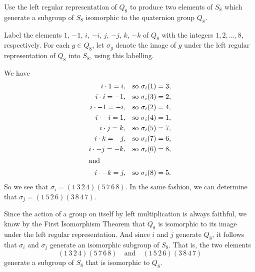  Use the left regular representation of $Q_8$ to produce two
elements of $S_8$ which generate a subgroup of $S_8$ isomorphic to the
quaternion group $Q_8$.
\begin{solution}
  Label the elements $1$, $-1$, $i$, $-i$, $j$, $-j$, $k$, $-k$ of
  $Q_8$ with the integers $1,2,\dots,8$, respectively. For each
  $g\in Q_8$, let $\sigma_g$ denote the image of $g$ under the left
  regular representation of $Q_8$ into $S_8$, using this labelling.

  We have
  \begin{align*}
    i\cdot1 = i, &\quad\text{so $\sigma_i(1) = 3$}, \\
    i\cdot i = -1, &\quad\text{so $\sigma_i(3) = 2$}, \\
    i\cdot-1 = -i, &\quad\text{so $\sigma_i(2) = 4$}, \\
    i\cdot-i = 1, &\quad\text{so $\sigma_i(4) = 1$}, \\
    i\cdot j = k, &\quad\text{so $\sigma_i(5) = 7$}, \\
    i\cdot k = -j, &\quad\text{so $\sigma_i(7) = 6$}, \\
    i\cdot-j = -k, &\quad\text{so $\sigma_i(6) = 8$}, \\
    \intertext{and}
    i\cdot-k = j, &\quad\text{so $\sigma_i(8) = 5$}.
  \end{align*}
  So we see that $\sigma_i = (1\,3\,2\,4)(5\,7\,6\,8)$. In the same
  fashion, we can determine that
  $\sigma_j = (1\,5\,2\,6)(3\,8\,4\,7)$.

  Since the action of a group on itself by left multiplication is
  always faithful, we know by the First Isomorphism Theorem that $Q_8$
  is isomorphic to its image under the left regular
  representation. And since $i$ and $j$ generate $Q_8$, it follows
  that $\sigma_i$ and $\sigma_j$ generate an isomorphic subgroup of
  $S_8$. That is, the two elements
  \begin{equation*}
    (1\,3\,2\,4)(5\,7\,6\,8) \quad\text{and}\quad
    (1\,5\,2\,6)(3\,8\,4\,7)
  \end{equation*}
  generate a subgroup of $S_8$ that is isomorphic to $Q_8$.
\end{solution}

